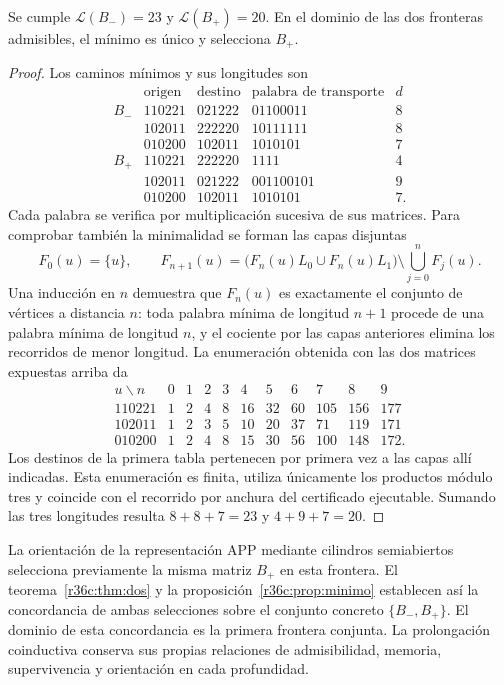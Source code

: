 \begin{proposition}
\label{r36c:prop:minimo}
Se cumple $\mathcal L(B_-)=23$ y $\mathcal L(B_+)=20$. En el dominio
de las dos fronteras admisibles, el mínimo es único y selecciona $B_+$.
\end{proposition}
\begin{proof}
Los caminos mínimos y sus longitudes son
\[
\begin{array}{c|c|c|c|c}
 &\text{origen}&\text{destino}&\text{palabra de transporte}&d\\\hline
B_-&110221&021222&01100011&8\\
 &102011&222220&10111111&8\\
 &010200&102011&1010101&7\\\hline
B_+&110221&222220&1111&4\\
 &102011&021222&001100101&9\\
 &010200&102011&1010101&7.
\end{array}
\]
Cada palabra se verifica por multiplicación sucesiva de sus matrices.
Para comprobar también la minimalidad se forman las capas disjuntas
\[
F_0(u)=\{u\},\qquad
F_{n+1}(u)=\bigl(F_n(u)L_0\cup F_n(u)L_1\bigr)
\setminus\bigcup_{j=0}^{n}F_j(u).
\]
Una inducción en $n$ demuestra que $F_n(u)$ es exactamente el conjunto
de vértices a distancia $n$: toda palabra mínima de longitud $n+1$
procede de una palabra mínima de longitud $n$, y el cociente por las
capas anteriores elimina los recorridos de menor longitud.
La enumeración obtenida con las dos matrices expuestas arriba da
\[
\begin{array}{c|rrrrrrrrrr}
u\backslash n&0&1&2&3&4&5&6&7&8&9\\\hline
110221&1&2&4&8&16&32&60&105&156&177\\
102011&1&2&3&5&10&20&37&71&119&171\\
010200&1&2&4&8&15&30&56&100&148&172.
\end{array}
\]
Los destinos de la primera tabla pertenecen por primera vez a las capas
allí indicadas. Esta enumeración es finita, utiliza únicamente los
productos módulo tres y coincide con el recorrido por anchura del
certificado ejecutable. Sumando las tres longitudes resulta $8+8+7=23$
y $4+9+7=20$.
\end{proof}

La orientación de la representación APP mediante cilindros semiabiertos
selecciona previamente la misma matriz $B_+$ en esta frontera. El
teorema~\ref{r36c:thm:dos} y la
proposición~\ref{r36c:prop:minimo} establecen así la concordancia de
ambas selecciones sobre el conjunto concreto $\{B_-,B_+\}$. El dominio
de esta concordancia es la primera frontera conjunta. La prolongación
coinductiva conserva sus propias relaciones de admisibilidad, memoria,
supervivencia y orientación en cada profundidad.

